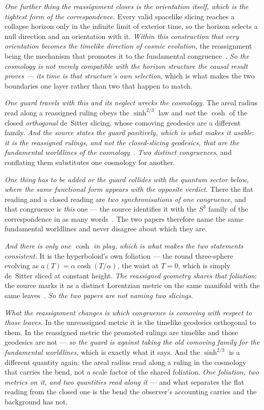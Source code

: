 \documentclass[11pt,a4paper]{article}
\theoremstyle{plain}
\theoremstyle{definition}
\begin{document}
\emph{One further thing the reassignment closes is the orientation itself, which is the tightest form of the
correspondence.} Every valid spacelike slicing reaches a collapse horizon only in the infinite limit of
exterior time, so the horizon selects a null direction and an orientation with it. \emph{Within this
construction that very orientation becomes the timelike direction of cosmic evolution}, the reassignment
being the mechanism that promotes it to the fundamental congruence~\cite{JanzenCRframework}. \emph{So the
cosmology is not merely compatible with the horizon structure the causal result proves --- its time is that
structure's own selection}, which is what makes the two boundaries one layer rather than two that happen to
match.

\emph{One guard travels with this and its neglect wrecks the cosmology.} The areal radius read along a
reassigned ruling obeys the $\sinh^{2/3}$ law and \emph{not} the $\cosh$ of the closed \emph{orthogonal}
de~Sitter slicing, whose comoving geodesics are a different family. \emph{And the source states the guard
positively, which is what makes it usable}: \emph{it is the reassigned rulings, and not the closed-slicing
geodesics, that are the fundamental worldlines of the cosmology}~\cite{JanzenCRframework}. \emph{Two distinct
congruences}, and conflating them substitutes one cosmology for another.

\emph{One thing has to be added or the guard collides with the quantum sector below, where the
same functional form appears with the opposite verdict.} There the flat reading and a closed reading are
\emph{two synchronisations of one congruence}, and that congruence is \emph{this} one --- the source
identifies it with the $S^{3}$ family of the correspondence in as many words~\cite{JanzenCanonicalTime}. The
two papers therefore name the same fundamental worldlines and never disagree about which they are.

\emph{And there is only one $\cosh$ in play, which is what makes the two statements consistent.} It is the
hyperboloid's own foliation --- the round three-sphere evolving as $a(T)=\alpha\cosh(T/\alpha)$, the waist at
$T=0$, which is simply de~Sitter sliced at constant height. \emph{The reassigned geometry shares that
foliation}: the source marks it as a distinct Lorentzian metric on the same manifold with the same
leaves~\cite{JanzenCanonicalTime}. \emph{So the two papers are not naming two slicings.}

\emph{What the reassignment changes is which congruence is comoving with respect to those leaves.} In the
unreassigned metric it is the timelike geodesics orthogonal to them. In the reassigned metric the promoted
rulings are timelike and those geodesics are not --- \emph{so the guard is against taking the old comoving
family for the fundamental worldlines}, which is exactly what it says. And the $\sinh^{2/3}$ is a different
quantity again: the areal radius read along a ruling in the cosmology that carries the bend, not a scale
factor of the shared foliation. \emph{One foliation, two metrics on it, and two quantities read along it}
--- and what separates the flat reading from the closed one is the bend the observer's accounting carries and
the background has not.
\end{document}
